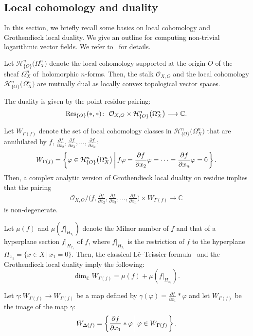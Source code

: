 \documentclass[pdftex]{sigma}%
\numberwithin{equation}{section}
\newcommand{\Set}[1]{\left\{#1\right\}}
\newcommand{\setDef}[2]{{#1}\left|\,\vphantom{#1}{#2}\right.}%
\newcommand{\SetDef}[2]{\Set{\setDef{#1}{#2}}}
\begin{document}


\subsection{Local cohomology and duality}

In this section, we briefly recall some basics on local cohomology and Grothendieck local duality. We give an outline for computing
non-trivial logarithmic vector fields. We refer to~\cite{TN20} for details.

Let ${\mathcal H}_{\{O\}}^n\big(\Omega_X^n\big)$ denote the local cohomology supported at the origin $O$ of the sheaf $\Omega_X^n$ of~holo\-morphic $n$-forms. Then, the stalk ${\mathcal O}_{X, O}$ and the local cohomology ${\mathcal H}_{\{O\}}^n\big(\Omega_X^n\big)$ are mutually dual as locally convex topological vector spaces.

The duality is given by the point residue pairing:
\[
{\rm Res}_{\{O\}}(*, *)\colon\ {\mathcal O}_{X,O} \times {\mathcal H}_{\{O\}}^n\big(\Omega_X^n\big) \longrightarrow {\mathbb C}.
\]

Let $W_{\Gamma(f)}$ denote the set of local cohomology classes in ${\mathcal H}_{\{O\}}^n\big(\Omega_X^n\big)$ that are annihilated by
$f$, $\frac{\partial f}{\partial x_2}, \frac{\partial f}{\partial x_{3}}, \dots, \frac{\partial f}{\partial x_{n}}$:
\[
W_{\Gamma(f)} = \SetDef{ \varphi \in {\mathcal H}_{\{O\}}^n\big(\Omega_X^n\big)}{f\varphi = \frac{\partial f}{\partial x_2}\varphi = \cdots = \frac{\partial f}{\partial x_{n}}\varphi = 0}.
\]
Then, a complex analytic version of Grothendieck local duality on residue implies that the pairing
\begin{gather*}
{\mathcal O}_{X,O}\Big/\bigg(f, \frac{\partial f}{\partial x_2}, \frac{\partial f}{\partial x_3},\ldots,\frac{\partial f}{\partial x_{n}}\bigg) \times W_{\Gamma(f)} \longrightarrow {\mathbb C}
\end{gather*}
is non-degenerate.

Let $\mu(f)$ and $\mu(f|_{H_{x_1}})$ denote the Milnor number of $f$ and that of a hyperplane section $f|_{H_{x_1}}$ of $f$, where $f|_{H_{x_1}}$ is the restriction of $f$ to the hyperplane $H_{x_1} =\{ x \in X \,|\, x_1=0\}$. Then, the classical L\^e--Teissier formula~\cite{L,Te73} and the Grothendieck local duality imply the following:
\[
\dim_{{\mathbb C}}W_{\Gamma(f)} = \mu(f) + \mu(f|_{H_{x_1}}).
\]

Let $\gamma\colon W_{\Gamma(f)} \longrightarrow W_{\Gamma(f)}$ be a map defined by
$\gamma(\varphi)=\frac{\partial f}{\partial x_1}\ast\varphi$ and let $W_{\Gamma(f)}$ be the image of the map $\gamma$:
\[
W_{\Delta(f)} = \SetDef{ \frac{\partial f}{\partial x_1}\ast\varphi}{\varphi \in W_{\Gamma(f)}}.
\]
\end{document}
